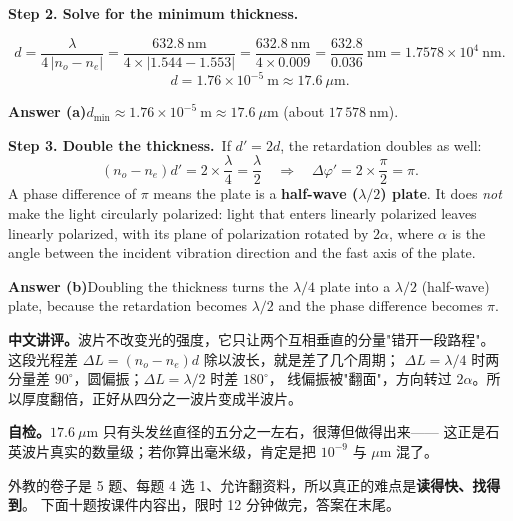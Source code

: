 ﻿\documentclass[11pt]{ctexart}
\begin{document}
\textbf{Step 2. Solve for the minimum thickness.}\par\noindent\[
d=\frac{\lambda}{4\,|n_o-n_e|}=\frac{632.8\ \mathrm{nm}}{4\times|1.544-1.553|}
=\frac{632.8\ \mathrm{nm}}{4\times 0.009}=\frac{632.8}{0.036}\ \mathrm{nm}
=1.7578\times10^{4}\ \mathrm{nm}.
\]
\[
d=1.76\times10^{-5}\ \mathrm{m}\approx 17.6\ \mu\mathrm{m}.
\]

\textbf{Answer (a)}\quad $d_{\min}\approx 1.76\times10^{-5}\ \mathrm{m}\approx 17.6\ \mu\mathrm{m}$
(about $17\,578\ \mathrm{nm}$).

\textbf{Step 3. Double the thickness.}\ If $d'=2d$, the retardation doubles as well:
\[
(n_o-n_e)d'=2\times\frac{\lambda}{4}=\frac{\lambda}{2}
\quad\Longrightarrow\quad
\Delta\varphi'=2\times\frac{\pi}{2}=\pi .
\]
A phase difference of $\pi$ means the plate is a \textbf{half-wave ($\lambda/2$) plate}.
It does \emph{not} make the light circularly polarized: light that enters linearly polarized
leaves linearly polarized, with its plane of polarization rotated by $2\alpha$, where $\alpha$ is
the angle between the incident vibration direction and the fast axis of the plate.

\textbf{Answer (b)}\quad Doubling the thickness turns the $\lambda/4$ plate into a
$\lambda/2$ (half-wave) plate, because the retardation becomes $\lambda/2$ and the phase difference
becomes $\pi$.

\textbf{中文讲评。}波片不改变光的强度，它只让两个互相垂直的分量"错开一段路程"。
这段光程差 $\Delta L=(n_o-n_e)d$ 除以波长，就是差了几个周期；
$\Delta L=\lambda/4$ 时两分量差 $90^\circ$，圆偏振；$\Delta L=\lambda/2$ 时差 $180^\circ$，
线偏振被"翻面"，方向转过 $2\alpha$。所以厚度翻倍，正好从四分之一波片变成半波片。

\textbf{自检。}$17.6\ \mu\mathrm{m}$ 只有头发丝直径的五分之一左右，很薄但做得出来——
这正是石英波片真实的数量级；若你算出毫米级，肯定是把 $10^{-9}$ 与 $\mu\mathrm{m}$ 混了。

\clearpage
{}

外教的卷子是 5 题、每题 4 选 1、允许翻资料，所以真正的难点是\textbf{读得快、找得到}。
下面十题按课件内容出，限时 12 分钟做完，答案在末尾。
\end{document}
